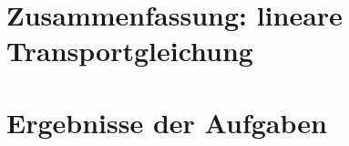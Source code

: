 \documentclass[12pt,a4paper]{scrartcl}
\numberwithin{equation}{section}
\begin{document}


\tableofcontents

\section{Zusammenfassung: lineare Transportgleichung}

\section{Ergebnisse der Aufgaben}

\end{document}

